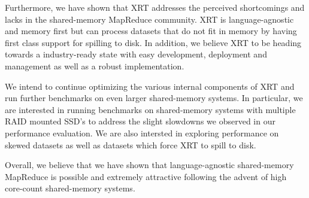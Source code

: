 \documentclass[twocolumn,11px]{article}       %
\begin{document}
Furthermore, we have shown that XRT addresses the perceived shortcomings and lacks in the shared-memory MapReduce community.
XRT is language-agnostic and memory first but can process datasets that do not fit in memory by having first class support for spilling to disk.
In addition, we believe XRT to be heading towards a industry-ready state with easy development, deployment and management as well as a robust implementation.

We intend to continue optimizing the various internal components of XRT and run further benchmarks on even larger shared-memory systems.
In particular, we are interested in running benchmarks on shared-memory systems with multiple RAID mounted SSD's to address the slight slowdowns we observed in our performance evaluation.
We are also intersted in exploring performance on skewed datasets as well as datasets which force XRT to spill to disk.

Overall, we believe that we have shown that language-agnostic shared-memory MapReduce is possible and extremely attractive following the advent of high core-count shared-memory systems.



\end{document}

